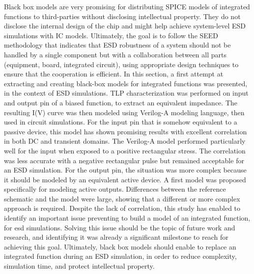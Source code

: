 Black box models are very promising for distributing SPICE models of integrated functions to third-parties without disclosing intellectual property.
They do not disclose the internal design of the chip and might help achieve system-level ESD simulations with IC models.
Ultimately, the goal is to follow the SEED \cite{seed} methodology that indicates that ESD robustness of a system should not be handled by a single component but with a collaboration between all parts (equipment, board, integrated circuit), using appropriate design techniques to ensure that the cooperation is efficient.
In this section, a first attempt at extracting and creating black-box models for integrated functions was presented, in the context of ESD simulations.
TLP characterization was performed on input and output pin of a biased function, to extract an equivalent impedance.
The resulting I(V) curve was then modeled using Verilog-A modeling language, then used in circuit simulations.
For the input pin that is somehow equivalent to a passive device, this model has shown promising results with excellent correlation in both DC and transient domains.
The Verilog-A model performed particularly well for the input when exposed to a positive rectangular stress.
The correlation was less accurate with a negative rectangular pulse but remained acceptable for an ESD simulation.
For the output pin, the situation was more complex because it should be modeled by an equivalent active device.
A first model was proposed specifically for modeling active outputs.
Differences between the reference schematic and the model were large, showing that a different or more complex approach is required.
Despite the lack of correlation, this study has enabled to identify an important issue preventing to build a model of an integrated function, for \gls{esd} simulations.
Solving this issue should be the topic of future work and research, and identifying it was already a significant milestone to reach for achieving this goal.
Ultimately, black box models should enable to replace an integrated function during an ESD simulation, in order to reduce complexity, simulation time, and protect intellectual property.
